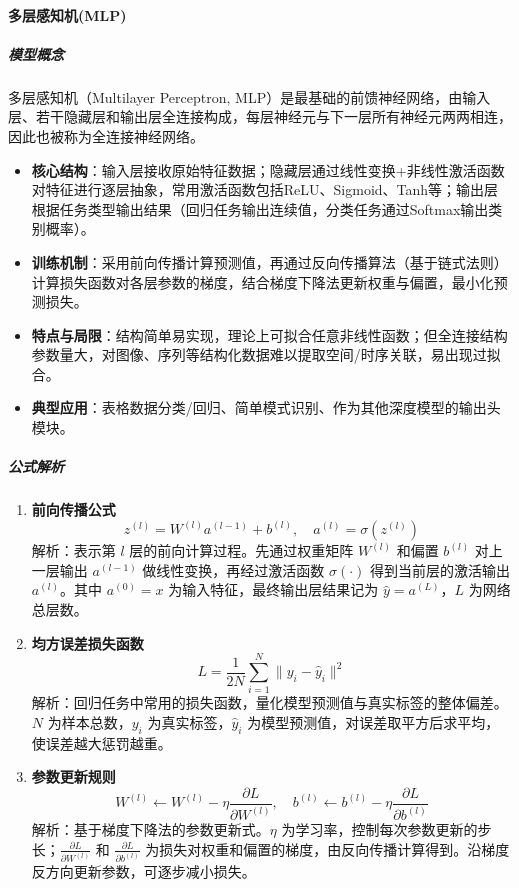 \documentclass[12pt]{article}
\begin{document}
\paragraph{多层感知机(MLP)}
\subparagraph{模型概念}
多层感知机（Multilayer Perceptron, MLP）是最基础的前馈神经网络，由输入层、若干隐藏层和输出层全连接构成，每层神经元与下一层所有神经元两两相连，因此也被称为全连接神经网络。
\begin{itemize}
    \item \textbf{核心结构}：输入层接收原始特征数据；隐藏层通过线性变换+非线性激活函数对特征进行逐层抽象，常用激活函数包括ReLU、Sigmoid、Tanh等；输出层根据任务类型输出结果（回归任务输出连续值，分类任务通过Softmax输出类别概率）。
    \item \textbf{训练机制}：采用前向传播计算预测值，再通过反向传播算法（基于链式法则）计算损失函数对各层参数的梯度，结合梯度下降法更新权重与偏置，最小化预测损失。
    \item \textbf{特点与局限}：结构简单易实现，理论上可拟合任意非线性函数；但全连接结构参数量大，对图像、序列等结构化数据难以提取空间/时序关联，易出现过拟合。
    \item \textbf{典型应用}：表格数据分类/回归、简单模式识别、作为其他深度模型的输出头模块。
\end{itemize}

\subparagraph{公式解析}
\begin{enumerate}
    \item \textbf{前向传播公式}
    \[
    z^{(l)} = W^{(l)} a^{(l-1)} + b^{(l)},\quad a^{(l)} = \sigma\left(z^{(l)}\right)
    \]
    解析：表示第 $l$ 层的前向计算过程。先通过权重矩阵 $W^{(l)}$ 和偏置 $b^{(l)}$ 对上一层输出 $a^{(l-1)}$ 做线性变换，再经过激活函数 $\sigma(\cdot)$ 得到当前层的激活输出 $a^{(l)}$。其中 $a^{(0)}=x$ 为输入特征，最终输出层结果记为 $\hat{y}=a^{(L)}$，$L$ 为网络总层数。

    \item \textbf{均方误差损失函数}
    \[
    L = \frac{1}{2N}\sum_{i=1}^N \|y_i - \hat{y}_i\|^2
    \]
    解析：回归任务中常用的损失函数，量化模型预测值与真实标签的整体偏差。$N$ 为样本总数，$y_i$ 为真实标签，$\hat{y}_i$ 为模型预测值，对误差取平方后求平均，使误差越大惩罚越重。

    \item \textbf{参数更新规则}
    \[
    W^{(l)} \leftarrow W^{(l)} - \eta \frac{\partial L}{\partial W^{(l)}},\quad b^{(l)} \leftarrow b^{(l)} - \eta \frac{\partial L}{\partial b^{(l)}}
    \]
    解析：基于梯度下降法的参数更新式。$\eta$ 为学习率，控制每次参数更新的步长；$\frac{\partial L}{\partial W^{(l)}}$ 和 $\frac{\partial L}{\partial b^{(l)}}$ 为损失对权重和偏置的梯度，由反向传播计算得到。沿梯度反方向更新参数，可逐步减小损失。
\end{enumerate}
\end{document}

